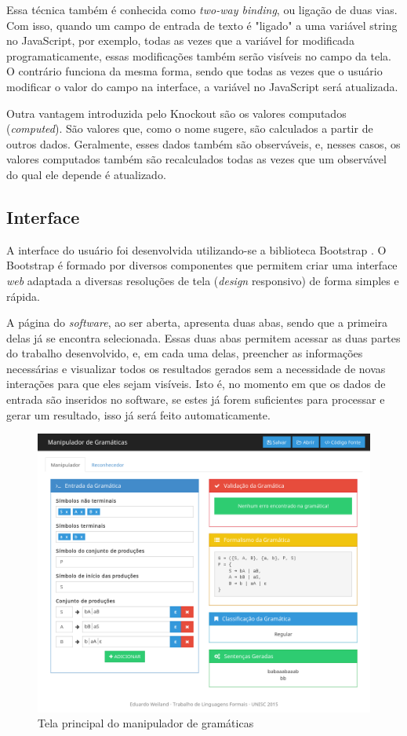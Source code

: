 \documentclass[12pt]{article}
\begin{document}
Essa técnica também é conhecida como \textit{two-way binding}, ou ligação de duas vias. Com isso, quando um campo de
entrada de texto é "ligado" a uma variável string no JavaScript, por exemplo, todas as vezes que a variável for
modificada programaticamente, essas modificações também serão visíveis no campo da tela. O contrário funciona da mesma
forma, sendo que todas as vezes que o usuário modificar o valor do campo na interface, a variável no JavaScript será
atualizada.

Outra vantagem introduzida pelo Knockout são os valores computados (\textit{computed}). São valores que, como o nome
sugere, são calculados a partir de outros dados. Geralmente, esses dados também são observáveis, e, nesses casos, os
valores computados também são recalculados todas as vezes que um observável do qual ele depende é atualizado.

\subsection{Interface}

A interface do usuário foi desenvolvida utilizando-se a biblioteca Bootstrap \cite{bootstrap}. O Bootstrap é formado
por diversos componentes que permitem criar uma interface \textit{web} adaptada a diversas resoluções de tela
(\textit{design} responsivo) de forma simples e rápida.

A página do \textit{software}, ao ser aberta, apresenta duas abas, sendo que a primeira delas já se encontra selecionada.
Essas duas abas permitem acessar as duas partes do trabalho desenvolvido, e, em cada uma delas, preencher as informações
necessárias e visualizar todos os resultados gerados sem a necessidade de novas interações para que eles sejam visíveis.
Isto é, no momento em que os dados de entrada são inseridos no software, se estes já forem suficientes para processar e
gerar um resultado, isso já será feito automaticamente.

\begin{figure}[ht]
  \centering
  \includegraphics[width=\textwidth]{images/manipulador.png}
  \caption{Tela principal do manipulador de gramáticas}
  \label{fig:manipulador}
\end{figure}
\end{document}
